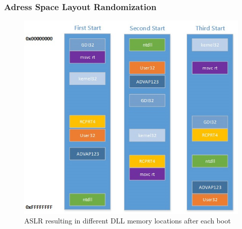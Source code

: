 \subsubsection{Adress Space Layout Randomization}
\label{sec:aslr}
\begin{figure}[!htbp]
\centering
\includegraphics[width=\textwidth,height=\textheight,keepaspectratio]{sections/background/defenses/aslr.jpg}
\caption{\gls{ASLR} resulting in different DLL memory locations after each boot}
\label{fig:aslr}
\end{figure}
